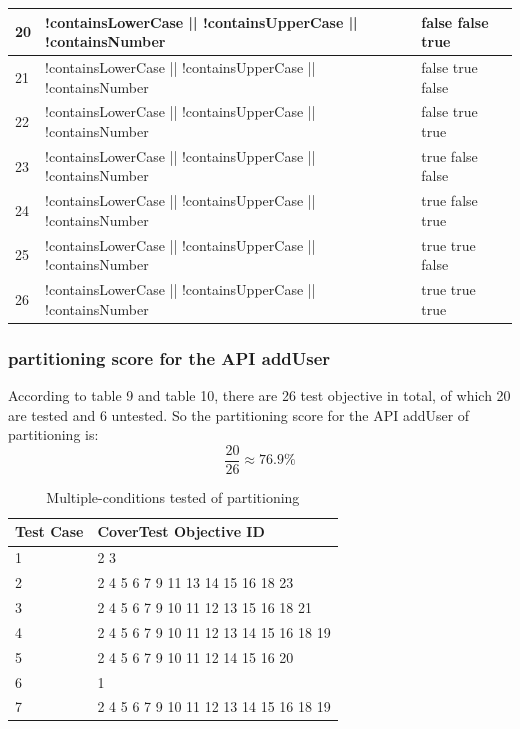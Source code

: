 \documentclass{article}
\begin{document}
\begin{longtable}{|p{2cm}|p{10cm}|p{3cm}|}
\hline
20&!containsLowerCase || !containsUpperCase || !containsNumber&false false true\\
\hline
21&!containsLowerCase || !containsUpperCase || !containsNumber&false true false\\
\hline
22&!containsLowerCase || !containsUpperCase || !containsNumber&false true true\\
\hline
23&!containsLowerCase || !containsUpperCase || !containsNumber&true false false\\
\hline
24&!containsLowerCase || !containsUpperCase || !containsNumber&true false true\\
\hline
25&!containsLowerCase || !containsUpperCase || !containsNumber&true true false\\
\hline
26&!containsLowerCase || !containsUpperCase || !containsNumber&true true true\\
\hline
\end{longtable}
\subsubsection{partitioning score for the API addUser}
According to table 9 and table 10, there are 26 test objective in total, of which 20 are tested and 6 untested. So the partitioning score for the API addUser of partitioning is:
$$\frac{20}{26}\approx76.9\%$$
\begin{longtable}{|p{2cm}|p{8cm}|}
\caption{Multiple-conditions tested of partitioning}\\
\hline 
Test Case& CoverTest Objective ID\\
\hline  
1&2 3\\
\hline
2&2 4 5 6 7 9 11 13 14 15 16 18 23\\
\hline
3&2 4 5 6 7 9 10 11 12 13 15 16 18 21\\
\hline
4&2 4 5 6 7 9 10 11 12 13 14 15 16 18 19\\
\hline
5&2 4 5 6 7 9 10 11 12 14 15 16 20\\
\hline
6&1\\
\hline
7&2 4 5 6 7 9 10 11 12 13 14 15 16 18 19\\
\hline
\end{longtable}
\end{document}
